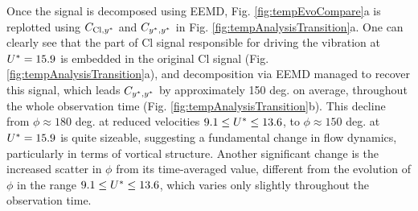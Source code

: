 \documentclass[oneside]{utmthesis}
\begin{document}
Once the signal is decomposed using EEMD, Fig. \ref{fig:tempEvoCompare}a is replotted using $C_{\text{Cl},y^{*}}$ and $C_{y^{*},y^{*}}$ in Fig. \ref{fig:tempAnalysisTransition}a. One can clearly see that the part of Cl signal responsible for driving the vibration at  $U^{*} = 15.9$ is embedded in the original Cl signal (Fig. \ref{fig:tempAnalysisTransition}a), and decomposition via EEMD managed to recover this signal, which leads $C_{y^{*},y^{*}}$ by approximately 150 deg. on average, throughout the whole observation time (Fig. \ref{fig:tempAnalysisTransition}b). This decline from $\phi \approx 180$ deg. at reduced velocities $9.1 \leq U^{*} \leq 13.6$, to $\phi \approx 150$ deg. at $U^{*} = 15.9$ is quite sizeable, suggesting a fundamental change in flow dynamics, particularly in terms of vortical structure. Another significant change is the increased scatter in $\phi$ from its time-averaged value, different from the evolution of $\phi$ in the range $9.1 \leq U^{*} \leq 13.6$, which varies only slightly throughout the observation time.
\end{document}
